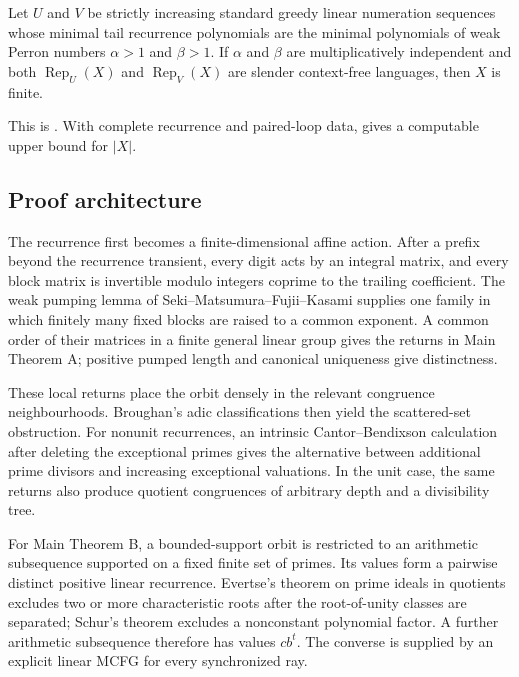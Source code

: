 \begin{maintheorem}
Let \(U\) and \(V\) be strictly increasing standard greedy linear
numeration sequences whose minimal tail recurrence polynomials are the
minimal polynomials of weak Perron numbers \(\alpha>1\) and \(\beta>1\).
If \(\alpha\) and \(\beta\) are multiplicatively independent and both
\(\operatorname{Rep}_U(X)\) and \(\operatorname{Rep}_V(X)\) are slender
context-free languages, then \(X\) is finite.
\end{maintheorem}

This is . With complete recurrence and
paired-loop data,  gives a
computable upper bound for \(\lvert X\rvert\).

\subsection{Proof architecture}

The recurrence first becomes a finite-dimensional affine action. After a
prefix beyond the recurrence transient, every digit acts by an integral
matrix, and every block matrix is invertible modulo integers coprime to the
trailing coefficient. The weak pumping lemma of
Seki--Matsumura--Fujii--Kasami supplies one family in which finitely many
fixed blocks are raised to a common exponent. A common order of their
matrices in a finite general linear group gives the returns in Main
Theorem A; positive pumped length and canonical uniqueness give
distinctness.

These local returns place the orbit densely in the relevant congruence
neighbourhoods. Broughan's adic classifications then yield the
scattered-set obstruction. For nonunit recurrences, an intrinsic
Cantor--Bendixson calculation after deleting the exceptional primes gives
the alternative between additional prime divisors and increasing exceptional
valuations. In the unit case, the same returns also produce quotient
congruences of arbitrary depth and a divisibility tree.

For Main Theorem B, a bounded-support orbit is restricted to an arithmetic
subsequence supported on a fixed finite set of primes. Its values form a
pairwise distinct positive linear recurrence. Evertse's theorem on prime
ideals in quotients excludes two or more characteristic roots after the
root-of-unity classes are separated; Schur's theorem excludes a
nonconstant polynomial factor. A further arithmetic subsequence therefore
has values \(cb^t\). The converse is supplied by an explicit linear MCFG
for every synchronized ray.

